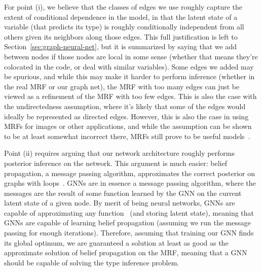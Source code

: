 For point (i), we believe that the classes of edges we use roughly capture the extent of conditional dependence in the model, in that the latent state of a variable (that predicts its type) is roughly conditionally independent from all others given its neighbors along those edges.
This full justification is left to Section~\ref{sec:graph-neural-net}, but it is summarized by saying that we add between nodes if those nodes are local in some sense (whether that means they're colocated in the code, or deal with similar variables).
Some edges we added may be spurious, and while this may make it harder to perform inference (whether in the real MRF or our graph net), the MRF with too many edges can just be viewed as a refinement of the MRF with too few edges.
This is also the case with the undirectedness assumption, where it's likely that some of the edges would ideally be represented as directed edges.
However, this is also the case in using MRFs for images or other applications, and while the assumption can be shown to be at least somewhat incorrect there, MRFs still prove to be useful models~\cite{rangarajan95markov}.

Point (ii) requires arguing that our network architecture roughly performs posterior inference on the network.
This argument is much easier: belief propagation, a message passing algorithm, approximates the correct posterior on graphs with loops~\cite{weiss2000correctness}.
GNNs are in essence a message passing algorithm, where the messages are the result of some function learned by the GNN on the current latent state of a given node.
By merit of being neural networks, GNNs are capable of approximating any function~\cite{hornik1989multilayer} (and storing latent state), meaning that GNNs are capable of learning belief propagation (assuming we run the message passing for enough iterations).
Therefore, assuming that training our GNN finds its global optimum, we are guaranteed a solution at least as good as the approximate solution of belief propagation on the MRF, meaning that a GNN should be capable of solving the type inference problem.

